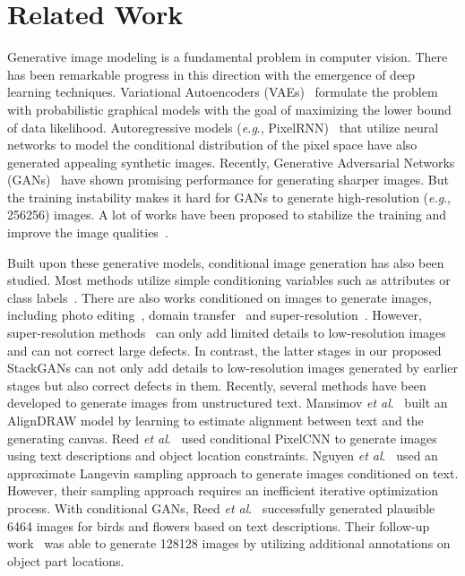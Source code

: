 \documentclass[10pt,journal,letterpaper,compsoc]{IEEEtran}
\begin{document}
\section{Related Work}\label{sec:related}
{
Generative image modeling is a fundamental problem in computer vision. There has been remarkable progress in this direction with the emergence of deep learning techniques. Variational Autoencoders (VAEs)~\cite{KingmaW14, RezendeMW14} formulate the problem with probabilistic graphical models with the goal of maximizing the lower bound of data likelihood. Autoregressive models (\emph{e.g}., PixelRNN)~\cite{OordKK16} that utilize neural networks to model the conditional distribution of the pixel space have also generated appealing synthetic images. Recently, Generative Adversarial Networks (GANs)~\cite{goodfellow2014generative} have shown promising performance for generating sharper images. But the training instability makes it hard for GANs to generate high-resolution (\emph{e.g}., 256256) images. A lot of works have been proposed to stabilize the training and improve the image qualities~\cite{Radford15, Salimans2016, MetzICLR17, Zhao2016, CheLJBL16, NguyenYBDC17}. 
}


{
Built upon these generative models, conditional image generation has also been studied. Most methods utilize simple conditioning variables such as attributes or class labels~\cite{YanYSL16, Oord16, ChenDHSSA16, Odena2016}. There are also works conditioned on images to generate images, including photo editing~\cite{Brock2016, ZhuKSE16}, domain transfer~\cite{Taigmaniclr17, pix2pix2017} and super-resolution~\cite{Casper2016, Christian2016}. However, super-resolution methods~\cite{Casper2016, Christian2016} can only add limited details to low-resolution images and can not correct large defects. In contrast, the latter stages in our proposed StackGANs can not only add details to low-resolution images generated by earlier stages but also correct defects in them. Recently, several methods have been developed to generate images from unstructured text. Mansimov \emph{et al}.~\cite{MansimovPBS15} built an AlignDRAW model by learning to estimate alignment between text and the generating canvas.  Reed \emph{et al}.~\cite{reed2016iclr17} used conditional PixelCNN to generate images using text descriptions and object location constraints. Nguyen \emph{et al}.~\cite{NguyenYBDC17} used an approximate Langevin sampling approach to generate images conditioned on text. However, their sampling approach requires an inefficient iterative optimization process. With conditional GANs, Reed \emph{et al}.~\cite{reed2016generative} successfully generated plausible 6464 images for birds and flowers based on text descriptions. Their follow-up work~\cite{reed2016learning} was able to generate 128128 images by utilizing additional annotations on object part locations.
}
\end{document}
